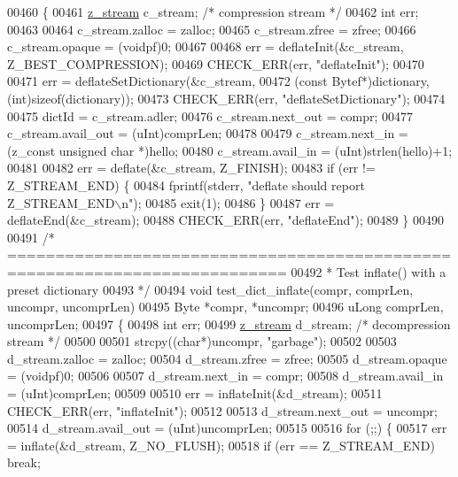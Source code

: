 \begin{DoxyCode}
{{{{{{{{{{{{{{00460 \{
00461     \hyperlink{structz__stream__s}{z\_stream} c\_stream; \textcolor{comment}{/* compression stream */}
00462     \textcolor{keywordtype}{int} err;
00463 
00464     c\_stream.zalloc = zalloc;
00465     c\_stream.zfree = zfree;
00466     c\_stream.opaque = (voidpf)0;
00467 
00468     err = deflateInit(&c\_stream, Z\_BEST\_COMPRESSION);
00469     CHECK\_ERR(err, \textcolor{stringliteral}{"deflateInit"});
00470 
00471     err = deflateSetDictionary(&c\_stream,
00472                 (\textcolor{keyword}{const} Bytef*)dictionary, (\textcolor{keywordtype}{int})\textcolor{keyword}{sizeof}(dictionary));
00473     CHECK\_ERR(err, \textcolor{stringliteral}{"deflateSetDictionary"});
00474 
00475     dictId = c\_stream.adler;
00476     c\_stream.next\_out = compr;
00477     c\_stream.avail\_out = (uInt)comprLen;
00478 
00479     c\_stream.next\_in = (z\_const \textcolor{keywordtype}{unsigned} \textcolor{keywordtype}{char} *)hello;
00480     c\_stream.avail\_in = (uInt)strlen(hello)+1;
00481 
00482     err = deflate(&c\_stream, Z\_FINISH);
00483     \textcolor{keywordflow}{if} (err != Z\_STREAM\_END) \{
00484         fprintf(stderr, \textcolor{stringliteral}{"deflate should report Z\_STREAM\_END\(\backslash\)n"});
00485         exit(1);
00486     \}
00487     err = deflateEnd(&c\_stream);
00488     CHECK\_ERR(err, \textcolor{stringliteral}{"deflateEnd"});
00489 \}
00490 
00491 \textcolor{comment}{/* ===========================================================================}
00492 \textcolor{comment}{ * Test inflate() with a preset dictionary}
00493 \textcolor{comment}{ */}
00494 \textcolor{keywordtype}{void} test\_dict\_inflate(compr, comprLen, uncompr, uncomprLen)
00495     Byte *compr, *uncompr;
00496     uLong comprLen, uncomprLen;
00497 \{
00498     \textcolor{keywordtype}{int} err;
00499     \hyperlink{structz__stream__s}{z\_stream} d\_stream; \textcolor{comment}{/* decompression stream */}
00500 
00501     strcpy((\textcolor{keywordtype}{char}*)uncompr, \textcolor{stringliteral}{"garbage"});
00502 
00503     d\_stream.zalloc = zalloc;
00504     d\_stream.zfree = zfree;
00505     d\_stream.opaque = (voidpf)0;
00506 
00507     d\_stream.next\_in  = compr;
00508     d\_stream.avail\_in = (uInt)comprLen;
00509 
00510     err = inflateInit(&d\_stream);
00511     CHECK\_ERR(err, \textcolor{stringliteral}{"inflateInit"});
00512 
00513     d\_stream.next\_out = uncompr;
00514     d\_stream.avail\_out = (uInt)uncomprLen;
00515 
00516     \textcolor{keywordflow}{for} (;;) \{
00517         err = inflate(&d\_stream, Z\_NO\_FLUSH);
00518         \textcolor{keywordflow}{if} (err == Z\_STREAM\_END) \textcolor{keywordflow}{break};
}}}}}}}}}}}}}}
\end{DoxyCode}
